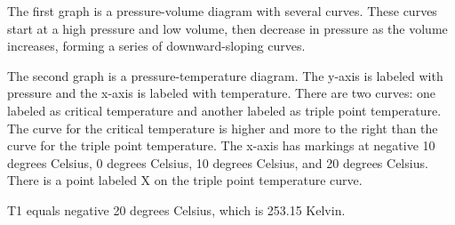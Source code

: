 The first graph is a pressure-volume diagram with several curves. These curves start at a high pressure and low volume, then decrease in pressure as the volume increases, forming a series of downward-sloping curves.

The second graph is a pressure-temperature diagram. The y-axis is labeled with pressure and the x-axis is labeled with temperature. There are two curves: one labeled as critical temperature and another labeled as triple point temperature. The curve for the critical temperature is higher and more to the right than the curve for the triple point temperature. The x-axis has markings at negative 10 degrees Celsius, 0 degrees Celsius, 10 degrees Celsius, and 20 degrees Celsius. There is a point labeled X on the triple point temperature curve.

T1 equals negative 20 degrees Celsius, which is 253.15 Kelvin.